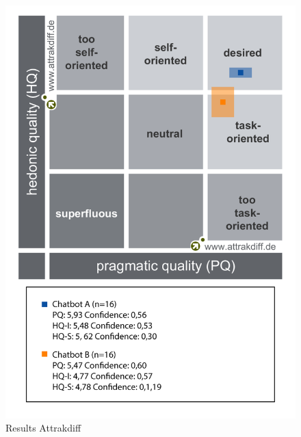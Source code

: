 \begin{figure}[h]
    \centering
    \includegraphics[scale=0.25]{figures/Portfolio-of-results-attrakdiff.png}
    \caption{Results Attrakdiff}
    \label{fig:portres}
\end{figure}
        

